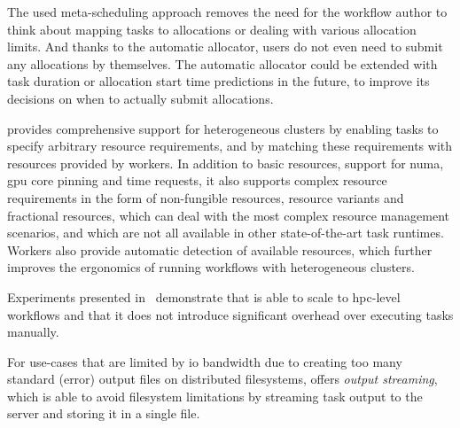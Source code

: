 \begin{description}[wide=0pt]
	\item[Allocation manager] The used meta-scheduling approach removes the need for the workflow author to think about mapping
		tasks to allocations or dealing with various allocation limits. And thanks to the automatic
		allocator, users do not even need to submit any allocations by themselves. The automatic allocator
		could be extended with task duration or allocation start time predictions in the future, to improve
		its decisions on when to actually submit allocations.
	\item[Cluster heterogeneity] \hyperqueue{} provides comprehensive support for heterogeneous
		clusters by enabling tasks to specify arbitrary resource requirements, and by matching these
		requirements with resources provided by workers. In addition to basic resources, support for
		\gls{numa}, \gls{gpu} core pinning and time requests, it also
		supports complex resource requirements in the form of non-fungible resources, resource variants and
		fractional resources, which can deal with the most complex resource management scenarios, and which
		are not all available in other state-of-the-art task runtimes. Workers also provide automatic
		detection of available resources, which further improves the ergonomics of running workflows with
		heterogeneous clusters.
	\item[Performance and scalability] Experiments presented in~ demonstrate that \hyperqueue{} is
		able to scale to \gls{hpc}-level workflows and that it does not introduce
		significant overhead over executing tasks manually.

		For use-cases that are limited by \gls{io} bandwidth due to creating too many
		standard (error) output files on distributed filesystems, \hyperqueue{} offers
		\emph{output streaming}, which is able to avoid filesystem limitations by streaming task output
		to the server and storing it in a single file.


\end{description}
